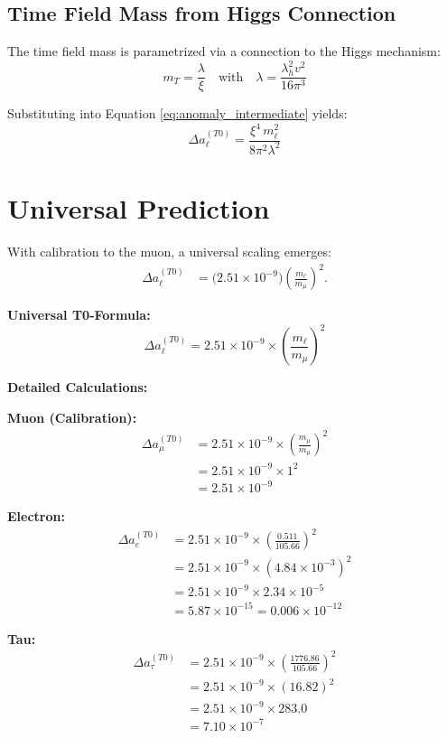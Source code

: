 \documentclass[12pt,a4paper]{article}
\theoremstyle{definition}
\begin{document}
	\subsection{Time Field Mass from Higgs Connection}
	
	The time field mass is parametrized via a connection to the Higgs mechanism\cite{pascher_higgs_connection_2025}:
	\begin{equation}
		m_T = \frac{\lambda}{\xi} \quad \text{with} \quad \lambda = \frac{\lambda_h^2 v^2}{16\pi^3}
		\label{eq:higgs_connection}
	\end{equation}
	
	Substituting into Equation \eqref{eq:anomaly_intermediate} yields:
	\begin{equation}
		\Delta a_\ell^{(T0)} = \frac{\xi^4 \, m_\ell^2}{8\pi^2 \lambda^2}
		\label{eq:final_formula}
	\end{equation}
	
	\section{Universal Prediction}
	
	With calibration to the muon, a universal scaling emerges:
	\begin{align}
		\Delta a_\ell^{(T0)} &= \big(2.51 \times 10^{-9}\big) \left(\frac{m_\ell}{m_\mu}\right)^2.
	\end{align}
	
	\begin{formula}
		\textbf{Universal T0-Formula:}
		$$\Delta a_\ell^{(T0)} = 2.51 \times 10^{-9} \times \left(\frac{m_\ell}{m_\mu}\right)^2$$
		
		\textbf{Detailed Calculations:}
		
		\textbf{Muon (Calibration):}
		\begin{align}
			\Delta a_\mu^{(T0)} &= 2.51 \times 10^{-9} \times \left(\frac{m_\mu}{m_\mu}\right)^2\\
			&= 2.51 \times 10^{-9} \times 1^2\\
			&= 2.51 \times 10^{-9}
		\end{align}
		
		\textbf{Electron:}
		\begin{align}
			\Delta a_e^{(T0)} &= 2.51 \times 10^{-9} \times \left(\frac{0.511}{105.66}\right)^2\\
			&= 2.51 \times 10^{-9} \times (4.84 \times 10^{-3})^2\\
			&= 2.51 \times 10^{-9} \times 2.34 \times 10^{-5}\\
			&= 5.87 \times 10^{-15} = 0.006 \times 10^{-12}
		\end{align}
		
		\textbf{Tau:}
		\begin{align}
			\Delta a_\tau^{(T0)} &= 2.51 \times 10^{-9} \times \left(\frac{1776.86}{105.66}\right)^2\\
			&= 2.51 \times 10^{-9} \times (16.82)^2\\
			&= 2.51 \times 10^{-9} \times 283.0\\
			&= 7.10 \times 10^{-7}
		\end{align}
	\end{formula}
	
\end{document}
